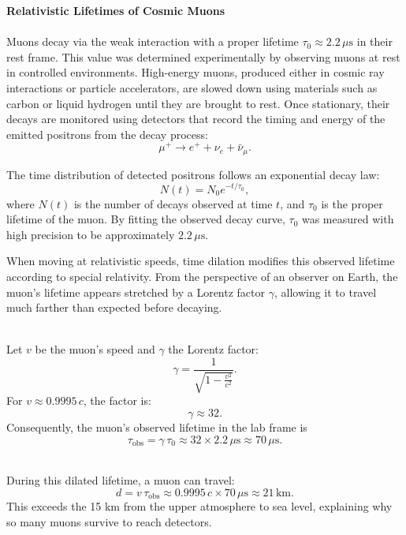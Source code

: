 \begin{technical}
    {\Large\textbf{Relativistic Lifetimes of Cosmic Muons}}\\[0.3em]

    \\[0.5em]
    Muons decay via the weak interaction with a proper lifetime $\tau_0 \approx 2.2\,\mu\text{s}$ in their rest frame. This value was determined experimentally by observing muons at rest in controlled environments. High-energy muons, produced either in cosmic ray interactions or particle accelerators, are slowed down using materials such as carbon or liquid hydrogen until they are brought to rest. Once stationary, their decays are monitored using detectors that record the timing and energy of the emitted positrons from the decay process:
    \[
    \mu^+ \to e^+ + \nu_e + \bar{\nu}_\mu.
    \]
    
    The time distribution of detected positrons follows an exponential decay law:
    \[
    N(t) = N_0 e^{-t / \tau_0},
    \]
    where $N(t)$ is the number of decays observed at time $t$, and $\tau_0$ is the proper lifetime of the muon. By fitting the observed decay curve, $\tau_0$ was measured with high precision to be approximately $2.2\,\mu\text{s}$.
    
    When moving at relativistic speeds, time dilation modifies this observed lifetime according to special relativity. From the perspective of an observer on Earth, the muon's lifetime appears stretched by a Lorentz factor $\gamma$, allowing it to travel much farther than expected before decaying.
    
    \\[0.5em]
    Let $v$ be the muon’s speed and $\gamma$ the Lorentz factor:
    \begin{equation*}
        \gamma = \frac{1}{\sqrt{1 - \frac{v^2}{c^2}}}.
    \end{equation*}
    For $v \approx 0.9995\,c$, the factor is:
    \[
        \gamma \approx 32.
    \]
    Consequently, the muon’s observed lifetime in the lab frame is
    \begin{equation*}
        \tau_{\mathrm{obs}} = \gamma \,\tau_0 \approx 32 \times 2.2\,\mu\text{s} \approx 70\,\mu\text{s}.
    \end{equation*}

    \\[0.5em]
    During this dilated lifetime, a muon can travel:
    \begin{equation*}
        d = v \,\tau_{\mathrm{obs}} 
          \approx 0.9995\,c \times 70\,\mu\text{s}
          \approx 21\,\text{km}.
    \end{equation*}
    This exceeds the 15 km from the upper atmosphere to sea level, explaining why so many muons survive to reach detectors.


\end{technical}
